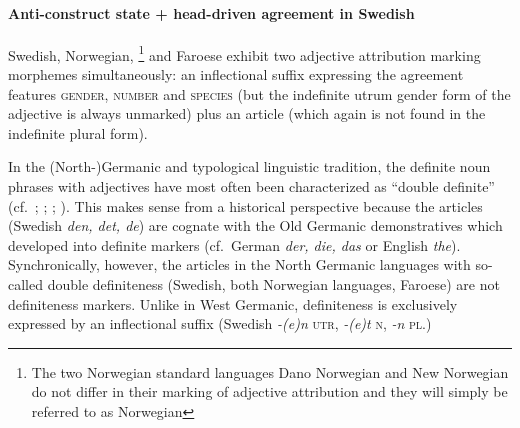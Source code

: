 \paragraph*{Anti\hyp{}construct state + head\hyp{}driven agreement in Swedish}\label{swedish synchr}
Swedish, Norwegian,
\footnote{The two Norwegian standard languages Dano Norwegian and New Norwegian do not differ in their marking of adjective attribution and they will simply be referred to as Norwegian}
 and Faroese exhibit two adjective attribution marking morphemes simultaneously: an inflectional suffix expressing the agreement features \textsc{gender}, \textsc{number} and \textsc{species} (but the indefinite utrum gender form of the adjective is always unmarked) plus an article (which again is not found in the indefinite plural form).

In the (North-)Germanic and typological linguistic tradition, the definite noun phrases with adjectives have most often been characterized as “double definite” (cf.~\citealt{kotcheva1996a}; \citealt{borjars1994}; \citealt{julien2003}; \citealt[354–355]{plank2003}). This makes sense from a historical perspective because the articles (Swedish \textit{den, det, de}) are cognate with the Old Germanic demonstratives which developed into definite markers (cf.~German \textit{der, die, das} or English \textit{the}). Synchronically, however, the articles in the North Germanic languages with so-called double definiteness (Swedish, both Norwegian languages, Faroese) are not definiteness markers. Unlike in West Germanic, definiteness is exclusively expressed by an inflectional suffix (Swedish \textit{-(e)n} \textsc{utr}, \textit{-(e)t} \textsc{n}, \textit{-n} \textsc{pl}.)


